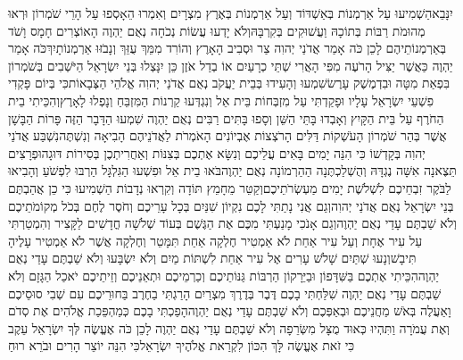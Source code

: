\documentclass[../main/main.tex]{subfiles}
\begin{document}
\begin{multicols}{\ncols}
יִנָּבֵא\PreVerseSpace{}הַשְׁמִיעוּ עַל אַרְמְנוֹת בְּאַשְׁדּוֹד וְעַל אַרְמְנוֹת בְּאֶרֶץ מִצְרָיִם וְאִמְרוּ הֵאָסְפוּ עַל הָרֵי שֹׁמְרוֹן וּרְאוּ מְהוּמֹת רַבּוֹת בְּתוֹכָהּ וַעֲשׁוּקִים בְּקִרְבָּהּ\PreVerseSpace{}וְלֹא יָדְעוּ עֲשׂוֹת נְכֹחָה נְאֻם יַהְוֶה הָאוֹצְרִים חָמָס וָשֹׁד בְּאַרְמְנוֹתֵיהֶם לָכֵן כֹּה אָמַר אֲדֹנַי יְהוִה צַר וּסְבִיב הָאָרֶץ וְהוֹרִד מִמֵּךְ עֻזֵּךְ וְנָבֹזּוּ אַרְמְנוֹתָיִךְ\PreVerseSpace{}כֹּה אָמַר יַהְוֶה כַּאֲשֶׁר יַצִּיל הָרֹעֶה מִפִּי הָאֲרִי שְׁתֵּי כְרָעַיִם אוֹ בְדַל אֹזֶן כֵּן יִנָּצְלוּ בְּנֵי יִשְׂרָאֵל הַיֹּשְׁבִים בְּשֹׁמְרוֹן בִּפְאַת מִטָּה וּבִדְמֶשֶׁק עָרֶשׂ\PreVerseSpace{}שִׁמְעוּ וְהָעִידוּ בְּבֵית יַעֲקֹב נְאֻם אֲדֹנַי יְהוִה אֱלֹהֵי הַצְּבָאוֹת\PreVerseSpace{}כִּי בְּיוֹם פָּקְדִי פִשְׁעֵי יִשְׂרָאֵל עָלָיו וּפָקַדְתִּי עַל מִזְבְּחוֹת בֵּית אֵל וְנִגְדְּעוּ קַרְנוֹת הַמִּזְבֵּחַ וְנָפְלוּ לָאָרֶץ\PreVerseSpace{}וְהִכֵּיתִי בֵית הַחֹרֶף עַל בֵּית הַקָּיִץ וְאָבְדוּ בָּתֵּי הַשֵּׁן וְסָפוּ בָּתִּים רַבִּים נְאֻם יַהְוֶה \ClosedSection{}שִׁמְעוּ הַדָּבָר הַזֶּה פָּרוֹת הַבָּשָׁן אֲשֶׁר בְּהַר שֹׁמְרוֹן הָעֹשְׁקוֹת דַּלִּים הָרֹצְצוֹת אֶבְיוֹנִים הָאֹמְרֹת לַאֲדֹנֵיהֶם הָבִיאָה וְנִשְׁתֶּה\PreVerseSpace{}נִשְׁבַּע אֲדֹנַי יְהוִה בְּקָדְשׁוֹ כִּי הִנֵּה יָמִים בָּאִים עֲלֵיכֶם וְנִשָּׂא אֶתְכֶם בְּצִנּוֹת וְאַחֲרִיתְכֶן בְּסִירוֹת דּוּגָה\PreVerseSpace{}וּפְרָצִים תֵּצֶאנָה אִשָּׁה נֶגְדָּהּ וְהֻשְׁלַכְתֶּנָה\SubEnd{} הַהַרְמוֹנָה נְאֻם יַהְוֶה\PreVerseSpace{}בֹּאוּ בֵית אֵל וּפִשְׁעוּ הַגִּלְגָּל הַרְבּוּ לִפְשֹׁעַ וְהָבִיאוּ לַבֹּקֶר זִבְחֵיכֶם לִשְׁלֹשֶׁת יָמִים מַעְשְׂרֹתֵיכֶם\PreVerseSpace{}וְקַטֵּר מֵחָמֵץ תּוֹדָה וְקִרְאוּ נְדָבוֹת הַשְׁמִיעוּ כִּי כֵן אֲהַבְתֶּם בְּנֵי יִשְׂרָאֵל נְאֻם אֲדֹנַי יְהוִה\PreVerseSpace{}וְגַם אֲנִי נָתַתִּי לָכֶם נִקְיוֹן שִׁנַּיִם בְּכָל עָרֵיכֶם וְחֹסֶר לֶחֶם בְּכֹל מְקוֹמֹתֵיכֶם וְלֹא שַׁבְתֶּם עָדַי נְאֻם יַהְוֶה\PreVerseSpace{}וְגַם אָנֹכִי מָנַעְתִּי מִכֶּם אֶת הַגֶּשֶׁם בְּעוֹד שְׁלֹשָׁה חֳדָשִׁים לַקָּצִיר וְהִמְטַרְתִּי עַל עִיר אֶחָת וְעַל עִיר אַחַת לֹא אַמְטִיר חֶלְקָה אַחַת תִּמָּטֵר וְחֶלְקָה אֲשֶׁר לֹא אַמְטִיר\SubEnd{} עָלֶיהָ תִּיבָשׁ\PreVerseSpace{}וְנָעוּ שְׁתַּיִם שָׁלֹשׁ עָרִים אֶל עִיר אַחַת לִשְׁתּוֹת מַיִם וְלֹא יִשְׂבָּעוּ וְלֹא שַׁבְתֶּם עָדַי נְאֻם יַהְוֶה\PreVerseSpace{}הִכֵּיתִי אֶתְכֶם בַּשִּׁדָּפוֹן וּבַיֵּרָקוֹן הַרְבּוֹת גַּנּוֹתֵיכֶם וְכַרְמֵיכֶם וּתְאֵנֵיכֶם וְזֵיתֵיכֶם יֹאכַל הַגָּזָם וְלֹא שַׁבְתֶּם עָדַי נְאֻם יַהְוֶה \ClosedSection{}שִׁלַּחְתִּי בָכֶם דֶּבֶר בְּדֶרֶךְ מִצְרַיִם הָרַגְתִּי בַחֶרֶב בַּחוּרֵיכֶם עִם שְׁבִי סוּסֵיכֶם וָאַעֲלֶה בְּאֹשׁ מַחֲנֵיכֶם וּבְאַפְּכֶם וְלֹא שַׁבְתֶּם עָדַי נְאֻם יַהְוֶה\PreVerseSpace{}הָפַכְתִּי בָכֶם כְּמַהְפֵּכַת אֱלֹהִים אֶת סְדֹם וְאֶת עֲמֹרָה וַתִּהְיוּ כְּאוּד מֻצָּל מִשְּׂרֵפָה וְלֹא שַׁבְתֶּם עָדַי נְאֻם יַהְוֶה \ClosedSection{}לָכֵן כֹּה אֶעֱשֶׂה לְּךָ יִשְׂרָאֵל עֵקֶב כִּי זֹאת אֶעֱשֶׂה לָּךְ הִכּוֹן לִקְרַאת אֱלֹהֶיךָ יִשְׂרָאֵל\PreVerseSpace{}כִּי הִנֵּה יוֹצֵר הָרִים וּבֹרֵא רוּחַ 
\end{multicols}
\end{document}
